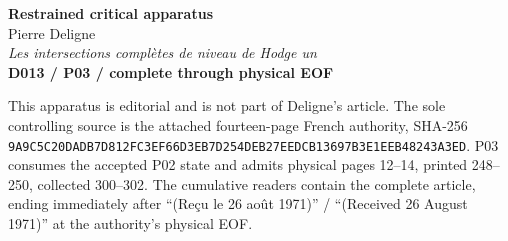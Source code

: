 \documentclass[10pt]{article}
\begin{document}
\begin{center}
{\Large\bfseries Restrained critical apparatus}\\[0.35em]
Pierre Deligne\\
\emph{Les intersections complètes de niveau de Hodge un}\\[0.55em]
\textbf{D013 / P03 / complete through physical EOF}
\end{center}

This apparatus is editorial and is not part of Deligne's article. The sole controlling source is the attached fourteen-page French authority, SHA-256
\texttt{9A9C5C20DADB7D812FC3EF66D3EB7D254DEB27EEDCB13697B3E1EEB48243A3ED}.
P03 consumes the accepted P02 state and admits physical pages 12--14, printed 248--250, collected 300--302. The cumulative readers contain the complete article, ending immediately after ``(Reçu le 26 août 1971)'' / ``(Received 26 August 1971)'' at the authority's physical EOF.
\end{document}
